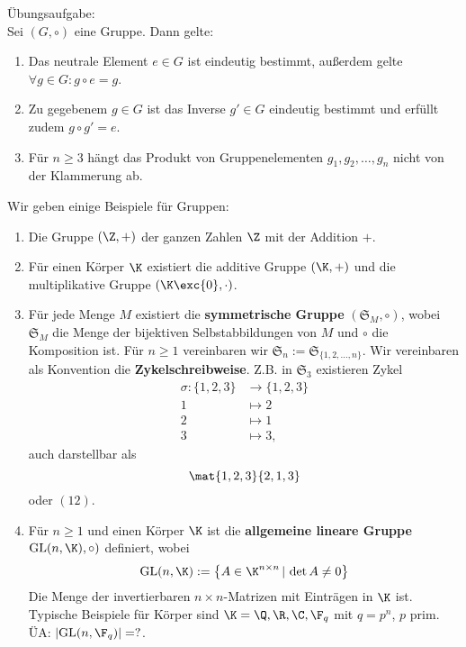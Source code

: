 \begin{bemerkung}Übungsaufgabe:\\
Sei $(G, \circ)$ eine Gruppe. Dann gelte:
\begin{enumerate}
\item Das neutrale Element $e \in G$ ist eindeutig bestimmt, außerdem gelte $ \forall g \in G : g \circ e = g$.
\item Zu gegebenem $g \in G$ ist das Inverse $g' \in G$ eindeutig bestimmt und erfüllt zudem $g \circ g' = e$.
\item Für $n \geq 3$ hängt das Produkt von Gruppenelementen $g_1, g_2, \dots, g_n$ nicht von der Klammerung ab.
\end{enumerate}
\end{bemerkung}

\begin{beispiele}
Wir geben einige Beispiele für Gruppen:
\begin{enumerate}
\item Die Gruppe $(\Z, +)$ der ganzen Zahlen $\Z$ mit der Addition $+$.
\item Für einen Körper $\K$ existiert die additive Gruppe $(\K, +)$ und die multiplikative Gruppe $(\K \exc \{0\}, \cdot)$.
\item Für jede Menge $M$ existiert die \textbf{symmetrische Gruppe} $(\mathfrak{S}_M, \circ)$, wobei $\mathfrak{S}_M$ die Menge der bijektiven Selbstabbildungen von $M$ und $\circ$ die Komposition ist. Für $n \geq 1$ vereinbaren wir $\mathfrak{S}_n := \mathfrak{S}_{\{1,2,\dots,n\}}$. Wir vereinbaren als Konvention die \textbf{Zykelschreibweise}. Z.B. in $\mathfrak{S}_3$ existieren Zykel
\begin{align}
\sigma: \{1,2,3\} &\to \{1,2,3\}\\
1 &\mapsto 2 \\
2 &\mapsto 1 \\
3 &\mapsto 3,
\end{align}
auch darstellbar als
\begin{equation}
\mat{1,2,3}{2,1,3}
\end{equation}
oder $(12)$.
\item Für $n \geq 1$ und einen Körper $\K$ ist die \textbf{allgemeine lineare Gruppe} $\text{GL}(n,\K), \circ)$ definiert, wobei 
\begin{equation}
\text{GL}(n, \K) := \left\{ A \in \K^{n\times n} \, | \, \det A \neq 0 \right\}
\end{equation}
Die Menge der invertierbaren $n \times n$-Matrizen mit Einträgen in $\K$ ist. Typische Beispiele für Körper sind $\K = \Q, \R, \C, \F_q$ mit $q = p^n$, $p$ prim.\\
ÜA: $| \text{GL}(n, \F_q)| = ?$.
\end{enumerate}
\end{beispiele}
